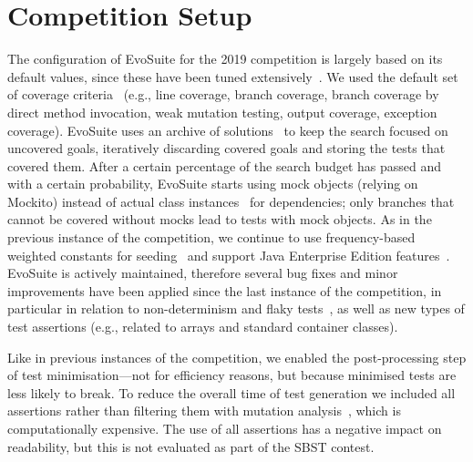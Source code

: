 \documentclass[sigconf,table]{acmart}
\newcommand{\TODO}[1]{\textbf{\textcolor{ScarletRed}{[TODO: #1]}}\xspace}
\newcommand{\TODO}[1]{}
\newcommand{\EVOSUITE}{{\sc EvoSuite}\xspace}
\begin{document}


\section{Competition Setup}

The configuration of \EVOSUITE for the 2019 competition is largely
based on its default values, since these have been tuned
extensively~\cite{arcuri2013parameter}. We used the default set of
coverage criteria~\cite{rojas2015combining} (e.g., line coverage,
branch coverage, branch coverage by direct method invocation, weak
mutation testing, output coverage, exception coverage). \EVOSUITE uses
an archive of solutions~\cite{emse_archive} to keep the search focused
on uncovered goals, iteratively discarding covered goals and storing
the tests that covered them. After a certain percentage of the search
budget has passed and with a certain probability, \EVOSUITE starts
using mock objects (relying on Mockito) instead of actual class
instances~\cite{ICST_Mocking17} for dependencies; only branches that
cannot be covered without mocks lead to tests with mock objects. As in
the previous instance of the competition, we continue to use
frequency-based weighted constants for
seeding~\cite{sakti2015instance} and support Java Enterprise Edition
features~\cite{arcuri2016java}. %
\EVOSUITE is actively maintained, therefore several bug fixes and
minor improvements have been applied since the last instance of the
competition, in particular in relation to non-determinism and flaky
tests~\cite{arcuri2014automated}, as well as new types of test
assertions (e.g., related to arrays and standard container classes).

Like in previous instances of the competition, we enabled the
post-processing step of test minimisation---not for efficiency
reasons, but because minimised tests are less likely to break. To
reduce the overall time of test generation we included all assertions
rather than filtering them with mutation
analysis~\cite{10.1109/TSE.2011.93}, which is computationally
expensive. The use of all assertions has a negative impact on
readability, but this is not evaluated as part of the SBST contest.
\end{document}
